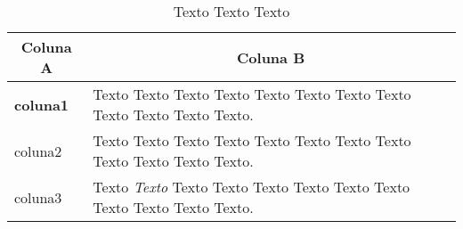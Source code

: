 

\begin{table}[ht]
\caption{Texto Texto Texto}
\label{tbl:tabelaex}
\centering
{}
\begin{tabular}{p{6cm}p{9cm}}
\hline
\multicolumn{1}{c}{\textbf{Coluna A}} & \multicolumn{1}{c}{\textbf{Coluna B}}  \\
\hline     
\textbf{coluna1} & Texto Texto Texto Texto Texto Texto Texto Texto Texto Texto Texto Texto.
\\ 

coluna2 & Texto Texto Texto Texto Texto Texto Texto Texto Texto Texto Texto Texto.              
\\ 

coluna3 & Texto \textit{Texto} Texto Texto Texto Texto Texto Texto Texto Texto Texto Texto.     
\\ \hline

\end{tabular}

\fonteautor
\end{table}
